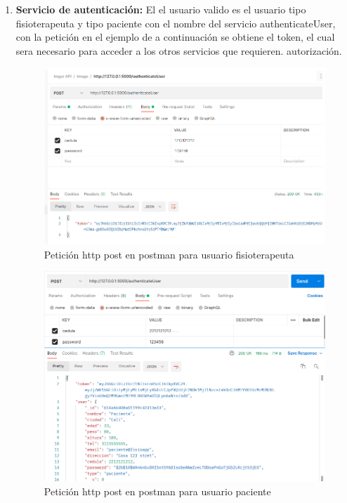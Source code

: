 \documentclass[12pt]{article}
\begin{document}
\begin{enumerate}
    \item \textbf{Servicio de autenticación:} El el usuario valido es el usuario tipo fisioterapeuta y tipo paciente con el nombre del servicio authenticateUser, con la petición en el ejemplo de a continuación se obtiene el token, el cual sera necesario para acceder a los otros servicios que requieren. autorización.
            \begin{figure}[ht]
            \centering
            \includegraphics[scale=0.4]{imag/POSTAUS.png}
            \caption{Petición http post en postman para usuario fisioterapeuta}
            \label{6}
            \end{figure}
            \FloatBarrier
            
            \begin{figure}[ht]
            \centering
            \includegraphics[scale=0.4]{imag/pacienteau.png}
            \caption{Petición http post en postman para usuario paciente}
            \label{6}
            \end{figure}
            \FloatBarrier
            

\end{enumerate}
\end{document}

